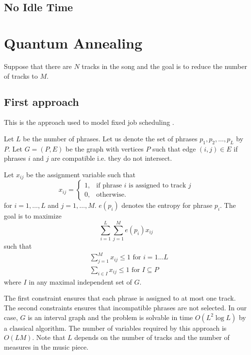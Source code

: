 \documentclass[11pt,a4paper]{article}
\begin{document}
\subsection{No Idle Time}

\section{Quantum Annealing}



Suppose that there are $ N $ tracks in the song and the goal is to reduce the number of tracks to $ M $.
\subsection{First approach}

This is the approach used to model fixed job scheduling \cite{arkin1987scheduling, barcia2005k}. 

Let $L $ be the number of phrases. Let us denote the set of phrases $ p_1,p_2,\dots,p_L $ by $ P $. Let $ G=(P,E) $ be the graph with vertices $ P $ such that edge $(i,j) \in E$ if phrases $ i $ and $ j $ are compatible i.e. they do not intersect.

Let $ x_{ij} $ be the assignment variable such that
\begin{equation}
x_{ij} =   \begin{cases}%
1,      & \text{if phrase $i$ is assigned to track $j$}\\
0, & \text{otherwise.}
\end{cases}
\end{equation}
 for $ i = 1, \dots ,L $ and $ j=1, \dots ,M  $. $ e(p_i) $ denotes the entropy for phrase $ p_i $. The goal is to maximize 
\begin{equation}
\sum_{i=1}^L \sum_{j=1}^M e(p_{i})x_{ij}	
 \end{equation}
 such that
 \begin{align}
 &\sum_{j=1}^M x_{ij} \leq 1 \mbox{ for }i=1\dots L \\
 &\sum_{i \in I} x_{ij} \leq 1 \mbox{ for } I \subseteq P
 \end{align}
 where $ I $ in any maximal independent set of $ G $.


The first constraint ensures that each phrase is assigned to at most one track. The second constraints ensures that incompatible phrases are not selected. In our case, $ G $ is an interval graph and the problem is solvable in time $ O(L^2 \log L) $ by a classical algorithm. The number of variables required by this approach is $ O(LM) $. Note that $ L $ depends on the number of tracks and the number of measures in the music piece.
\end{document}
